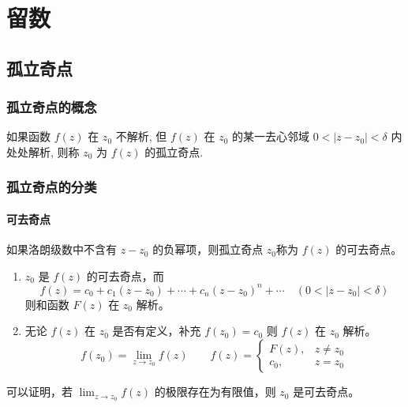 \section{留数}
\label{留数}
\subsection{孤立奇点}
\label{孤立奇点}
\subsubsection{孤立奇点的概念}
\label{孤立奇点的概念}
如果函数 \(f(z)\) 在 \(z_0\) 不解析, 但 \(f(z)\) 在 \(z_0\)
的某一去心邻域 \(0 < |z - z_0| < \delta\) 内处处解析, 则称 \(z_0\) 为
\(f(z)\) 的孤立奇点.
\subsubsection{孤立奇点的分类}
\label{孤立奇点的分类}
\paragraph{可去奇点}
\label{可去奇点}
如果洛朗级数中不含有 \(z-z_0\) 的负幂项，则孤立奇点 \(z_0\)称为 \(f(z)\)
的可去奇点。

\begin{tcolorbox}[title={Note},colback=red!5!white
,colframe=red!75!black
,colbacktitle=yellow!50!red
,coltitle=red!25!black, fonttitle=\bfseries,subtitle style={boxrule=0.4pt, colback=yellow!50!red!25!white}]
\begin{enumerate}
\item \(z_0\) 是 \(f(z)\) 的可去奇点，而
\[
   f(z)=c_0+c_1(z-z_0)+\cdots+c_n(z-z_0)^n+\cdots\quad(0<\left|z-z_0\right|<\delta)
   \] 则和函数 \(F(z)\) 在 \(z_0\) 解析。
\item 无论 \(f(z)\) 在 \(z_0\) 是否有定义，补充 \(f(z_0)=c_0\) 则 \(f(z)\) 在 \(z_0\) 解析。
\begin{equation*}
f(z_{0})=\lim _{z\rightarrow z_{0}}f(z)\qquad
f(z)=\begin{cases}
F(z), & z\neq z_{0} \\
c_{0}, & z=z_{0}
\end{cases}
\end{equation*}
\end{enumerate}

可以证明，若 \(\lim _{z\rightarrow z_{0}}f(z)\) 的极限存在为有限值，则 \(z_{0}\) 是可去奇点。

\end{tcolorbox}

